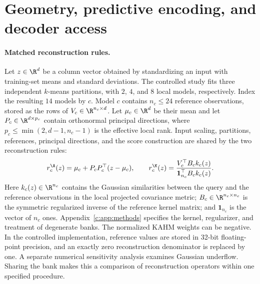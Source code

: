 \section{Geometry, predictive encoding, and decoder access}\label{c:sec:method}

\paragraph{Matched reconstruction rules.}
Let $z\in\R^d$ be a column vector obtained by standardizing an input with
training-set means and standard deviations. The controlled study fits three
independent $k$-means partitions, with $2$, $4$, and $8$ local models,
respectively. Index the resulting $14$ models by $c$. Model $c$ contains
$n_c\leq24$ reference observations, stored as the rows of
$V_c\in\R^{n_c\times d}$. Let $\mu_c\in\R^d$ be their mean and let
$P_c\in\R^{d\times p_c}$ contain orthonormal principal directions, where
$p_c\leq\min(2,d-1,n_c-1)$ is the effective local rank. Input scaling,
partitions, references, principal directions, and the score construction
are shared by the two reconstruction rules:
\begin{equation}\label{c:eq:affine}
 r_c^{\A}(z)=\mu_c+P_cP_c^\top(z-\mu_c),\qquad
 r_c^{\K}(z)=
 \frac{V_c^\top B_c k_c(z)}{\boldsymbol 1_{n_c}^\top B_c k_c(z)}.
\end{equation}
Here $k_c(z)\in\R^{n_c}$ contains the Gaussian similarities between the
query and the reference observations in the local projected covariance
metric; $B_c\in\R^{n_c\times n_c}$ is the symmetric regularized inverse of
the reference kernel matrix; and $\boldsymbol 1_{n_c}$ is the vector of
$n_c$ ones. Appendix~\ref{c:app:methods} specifies the kernel, regularizer,
and treatment of degenerate banks. The normalized KAHM weights can be
negative. In the controlled implementation, reference values are stored in
32-bit floating-point precision, and an exactly zero reconstruction
denominator is replaced by one. A separate numerical sensitivity analysis
examines Gaussian underflow. Sharing the bank makes this a comparison of
reconstruction operators within one specified procedure.

